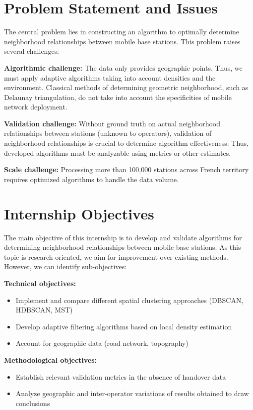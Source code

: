 \documentclass[12pt,a4paper]{report}
\begin{document}
\section{Problem Statement and Issues}

The central problem lies in constructing an algorithm to optimally determine neighborhood relationships between mobile base stations. This problem raises several challenges:

\textbf{Algorithmic challenge:} The data only provides geographic points. Thus, we must apply adaptive algorithms taking into account densities and the environment. Classical methods of determining geometric neighborhood, such as Delaunay triangulation, do not take into account the specificities of mobile network deployment.

\textbf{Validation challenge:} Without ground truth on actual neighborhood relationships between stations (unknown to operators), validation of neighborhood relationships is crucial to determine algorithm effectiveness. Thus, developed algorithms must be analyzable using metrics or other estimates.

\textbf{Scale challenge:} Processing more than 100,000 stations across French territory requires optimized algorithms to handle the data volume.

\section{Internship Objectives}

The main objective of this internship is to develop and validate algorithms for determining neighborhood relationships between mobile base stations. As this topic is research-oriented, we aim for improvement over existing methods. However, we can identify sub-objectives:

\textbf{Technical objectives:}
\begin{itemize}
    \item Implement and compare different spatial clustering approaches (DBSCAN, HDBSCAN, MST)
    \item Develop adaptive filtering algorithms based on local density estimation
    \item Account for geographic data (road network, topography)
\end{itemize}

\textbf{Methodological objectives:}
\begin{itemize}
    \item Establish relevant validation metrics in the absence of handover data
    \item Analyze geographic and inter-operator variations of results obtained to draw conclusions
\end{itemize}
\end{document}
